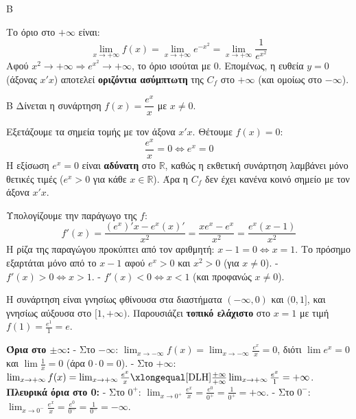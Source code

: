 \begin{thema}{Β}
\begin{erwthma}
\item Το όριο στο $+\infty$ είναι:
\[ \lim_{x\to+\infty} f(x) = \lim_{x\to+\infty} e^{-x^2} = \lim_{x\to+\infty} \frac{1}{e^{x^2}} \]
Αφού $x^2 \to +\infty \Rightarrow e^{x^2} \to +\infty$, το όριο ισούται με 0.
Επομένως, η ευθεία $y = 0$ (άξονας $x'x$) αποτελεί \textbf{οριζόντια ασύμπτωτη} της $C_f$ στο $+\infty$ (και ομοίως στο $-\infty$).
\end{erwthma}
\end{thema}

\begin{thema}{Β}
Δίνεται η συνάρτηση $f(x) = \dfrac{e^x}{x}$ με $x \neq 0$.
\begin{erwthma}
\item Εξετάζουμε τα σημεία τομής με τον άξονα $x'x$. Θέτουμε $f(x) = 0$:
\[ \frac{e^x}{x} = 0 \Leftrightarrow e^x = 0 \]
Η εξίσωση $e^x = 0$ είναι \textbf{αδύνατη} στο $\mathbb{R}$, καθώς η εκθετική συνάρτηση λαμβάνει μόνο θετικές τιμές ($e^x > 0$ για κάθε $x \in \mathbb{R}$). 
Άρα η $C_f$ δεν έχει κανένα κοινό σημείο με τον άξονα $x'x$.

\item Υπολογίζουμε την παράγωγο της $f$:
\[ f'(x) = \frac{(e^x)'x - e^x(x)'}{x^2} = \frac{xe^x - e^x}{x^2} = \frac{e^x(x-1)}{x^2} \]
Η ρίζα της παραγώγου προκύπτει από τον αριθμητή: $x - 1 = 0 \Leftrightarrow x = 1$.
Το πρόσημο εξαρτάται μόνο από το $x-1$ αφού $e^x > 0$ και $x^2 > 0$ (για $x \neq 0$).
- $f'(x) > 0 \Leftrightarrow x > 1$.
- $f'(x) < 0 \Leftrightarrow x < 1$ (και προφανώς $x \ne 0$).
\begin{center}
\end{center}
Η συνάρτηση είναι γνησίως φθίνουσα στα διαστήματα $(-\infty, 0)$ και $(0, 1]$, και γνησίως αύξουσα στο $[1, +\infty)$.
Παρουσιάζει \textbf{τοπικό ελάχιστο} στο $x = 1$ με τιμή $f(1) = \frac{e^1}{1} = e$.

\item \textbf{Όρια στο $\pm\infty$:}
- Στο $-\infty$: $\lim_{x\to-\infty} f(x) = \lim_{x\to-\infty} \frac{e^x}{x} = 0$, διότι $\lim e^x = 0$ και $\lim \frac{1}{x} = 0$ (άρα $0 \cdot 0 = 0$).
- Στο $+\infty$: $\lim_{x\to+\infty} f(x) = \lim_{x\to+\infty} \frac{e^x}{x} \xlongequal[\text{DLH}]{\frac{+\infty}{+\infty}} \lim_{x\to+\infty} \frac{e^x}{1} = +\infty$.
\textbf{Πλευρικά όρια στο 0:}
- Στο $0^+$: $\lim_{x\to0^+} \frac{e^x}{x} = \frac{e^0}{0^+} = \frac{1}{0^+} = +\infty$.
- Στο $0^-$: $\lim_{x\to0^-} \frac{e^x}{x} = \frac{e^0}{0^-} = \frac{1}{0^-} = -\infty$.


\end{erwthma}
\end{thema}
